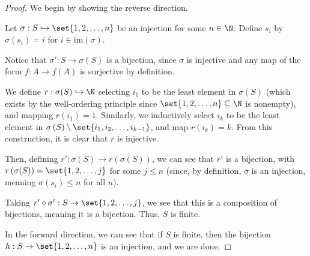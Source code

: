 \documentclass[11pt]{mypackage}
\begin{document}
\begin{proof}
  We begin by showing the reverse direction.\newline

  Let $\sigma: S\hookrightarrow \set{1,2,\dots,n}$ be an injection for some $n\in \N$. Define $s_i$ by $\sigma\left(s_i\right) = i$ for $i\in \text{im}\left(\sigma\right)$.\newline

  Notice that $\sigma': S\rightarrow \sigma(S)$ is a bijection, since $\sigma$ is injective and any map of the form $f: A\rightarrow f(A)$ is surjective by definition.\newline

  We define $r: \sigma(S) \hookrightarrow \N$ selecting $i_1$ to be the least element in $\sigma(S)$ (which exists by the well-ordering principle since $\set{1,2,\dots,n}\subseteq \N$ is nonempty), and mapping $r\left(i_1\right)= 1$. Similarly, we inductively select $i_k$ to be the least element in $\sigma\left(S\right) \setminus \set{i_1,i_2,\dots,i_{k-1}}$, and map $r\left(i_k\right) = k$. From this construction, it is clear that $r$ is injective.\newline

  Then, defining $r': \sigma\left(S\right)\rightarrow r\left(\sigma(S)\right)$, we can see that $r'$ is a bijection, with $r\left(\sigma(S)\right) = \set{1,2,\dots,j}$ for some $j\leq n$ (since, by definition, $\sigma$ is an injection, meaning $\sigma\left(s_i\right) \leq n$ for all $n$).\newline

  Taking $r'\circ \sigma': S\rightarrow \set{1,2,\dots,j}$, we see that this is a composition of bijections, meaning it is a bijection. Thus, $S$ is finite.\newline

  In the forward direction, we can see that if $S$ is finite, then the bijection $h: S\rightarrow \set{1,2,\dots,n}$ is an injection, and we are done.
\end{proof}
%
\end{document}
